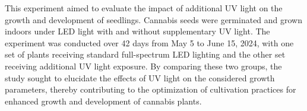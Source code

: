 This experiment aimed to evaluate the impact of additional UV light on the growth and development of  seedlings. Cannabis seeds were germinated and grown indoors under LED light with and without supplementary UV light. The experiment was conducted over 42 days from May 5 to June 15, 2024, with one set of plants receiving standard full-spectrum LED lighting and the other set receiving additional UV light exposure. By comparing these two groups, the study sought to elucidate the effects of UV light on the considered growth parameters, thereby contributing to the optimization of cultivation practices for enhanced growth and development of cannabis plants.